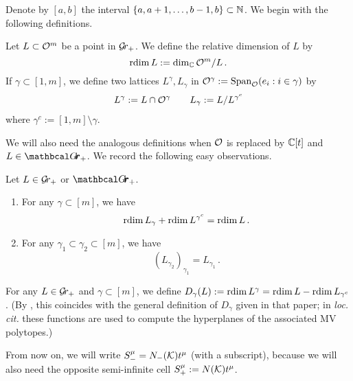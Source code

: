 \documentclass{article}
\begin{document}
Denote by $[a,b]$ the interval $\{a,a+1,\dots,b-1,b\}\subset\mathbb N$. We begin with the following definitions.
% 
\begin{definition}
Let $ L \subset \mathcal O^m$ be a point in $ \mathcal{G}\!r_+$.  We define the relative dimension of $L $ by
$$
    \operatorname{rdim} L := \dim_\mathbb C \mathcal O^m/L\,. 
$$
% 
If $ \gamma \subset [1,m]$, we define two lattices $ L^\gamma, L_\gamma $ in $ \mathcal O^\gamma := \operatorname{Span}_{\mathcal O}(e_i : i \in \gamma)$ by
\begin{gather*}
    L^\gamma:= L \cap \mathcal O^\gamma  \qquad L_\gamma := L / L^{\gamma^c} 
\end{gather*}
where $ \gamma^c := [1,m] \setminus \gamma$.
% 
\end{definition}
We will also need the analogous definitions when $ \mathcal O$ is replaced by $ \mathbb C[t]$ and $L \in \Grth_+$. 
% 
We record the following easy observations.
\begin{lemma} 
\label{le:rdimTrans} 
Let $ L \in \mathcal{G}\!r_+$ or $\Grth_+$.
\begin{enumerate}
    \item For any $ \gamma \subset [m] $, we have 
    $$ 
        \operatorname{rdim} L_\gamma + \operatorname{rdim} L^{\gamma^c} = \operatorname{rdim} L \,.
    $$
    \item For any $ \gamma_1 \subset \gamma_2 \subset [m]$, we have 
    $$ 
        (L_{\gamma_2})_{\gamma_1} = L_{\gamma_1}\,.
    $$
\end{enumerate}
\end{lemma}
% 
For any $ L \in \mathcal{G}\!r_+ $ and $\gamma \subset [m]$, we define $ D_\gamma(L) := \operatorname{rdim} L^\gamma = \operatorname{rdim} L - \operatorname{rdim} L_{\gamma^c}$. (By \cite[Proposition 9.3]{kamnitzer2010mirkovic}, this coincides with the general definition of $ D_\gamma$ given in that paper; in \textit{loc. cit.} these functions are used to compute the hyperplanes of the associated MV polytopes.) 

From now on, we will write $ S^\mu_- = N_-(\mathcal K) t^\mu$ (with a subscript), because we will also need the opposite semi-infinite cell $S^\mu_+ := N(\mathcal K)t^\mu$.
\end{document}
